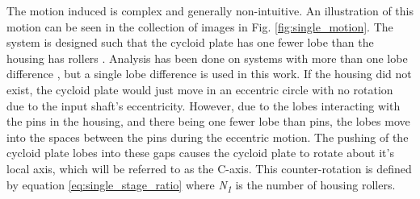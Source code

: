 The motion induced is complex and generally non-intuitive. An illustration of this motion can be seen in the collection of images in Fig. \ref{fig:single_motion}. The system is designed such that the cycloid plate has one fewer lobe than the housing has rollers \cite{ref:pollitt}. Analysis has been done on systems with more than one lobe difference \cite{ref:hsieh_traditional}, but a single lobe difference is used in this work. If the housing did not exist, the cycloid plate would just move in an eccentric circle with no rotation due to the input shaft's eccentricity. However, due to the lobes interacting with the pins in the housing, and there being one fewer lobe than pins, the lobes move into the spaces between the pins during the eccentric motion. The pushing of the cycloid plate lobes into these gaps causes the cycloid plate to rotate about it's local axis, which will be referred to as the C-axis. This counter-rotation is defined by equation \ref{eq:single_stage_ratio} \cite{ref:on_the_lobe} where \textit{N\textsubscript{1}} is the number of housing rollers.

